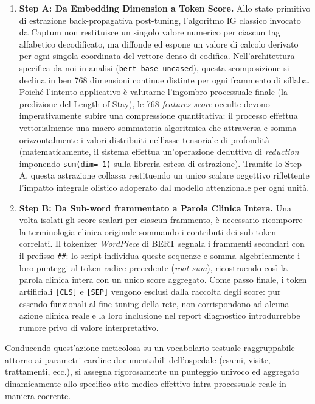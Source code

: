 \begin{enumerate}
    \item \textbf{Step A: Da Embedding Dimension a Token Score.} Allo stato primitivo di estrazione back-propagativa post-tuning, l'algoritmo IG classico invocato da Captum non restituisce un singolo valore numerico per ciascun tag alfabetico decodificato, ma diffonde ed espone un valore di calcolo derivato per ogni singola coordinata del vettore denso di codifica. Nell'architettura specifica da noi in analisi (\texttt{bert-base-uncased}), questa scomposizione si declina in ben 768 dimensioni continue distinte per ogni frammento di sillaba. Poiché l'intento applicativo è valutarne l'ingombro processuale finale (la predizione del Length of Stay), le 768 \textit{features score} occulte devono imperativamente subire una compressione quantitativa: il processo effettua vettorialmente una macro-sommatoria algoritmica che attraversa e somma orizzontalmente i valori distribuiti nell'asse tensoriale di profondità (matematicamente, il sistema effettua un'operazione deduttiva di \textit{reduction} imponendo \texttt{sum(dim=-1)} sulla libreria estesa di estrazione). Tramite lo Step A, questa astrazione collassa restituendo un unico scalare oggettivo riflettente l'impatto integrale olistico adoperato dal modello attenzionale per ogni unità.
    \item \textbf{Step B: Da Sub-word frammentato a Parola Clinica Intera.} Una volta isolati gli score scalari per ciascun frammento, è necessario ricomporre la terminologia clinica originale sommando i contributi dei sub-token correlati. Il tokenizer \textit{WordPiece} di BERT segnala i frammenti secondari con il prefisso \texttt{\#\#}: lo script individua queste sequenze e somma algebricamente i loro punteggi al token radice precedente (\textit{root sum}), ricostruendo così la parola clinica intera con un unico score aggregato. Come passo finale, i token artificiali \texttt{[CLS]} e \texttt{[SEP]} vengono esclusi dalla raccolta degli score: pur essendo funzionali al fine-tuning della rete, non corrispondono ad alcuna azione clinica reale e la loro inclusione nel report diagnostico introdurrebbe rumore privo di valore interpretativo.
\end{enumerate}

Conducendo quest'azione meticolosa su un vocabolario testuale raggruppabile attorno ai parametri cardine documentabili dell'ospedale (esami, visite, trattamenti, ecc.), si assegna rigorosamente un punteggio univoco ed aggregato dinamicamente allo specifico atto medico effettivo intra-processuale reale in maniera coerente.

